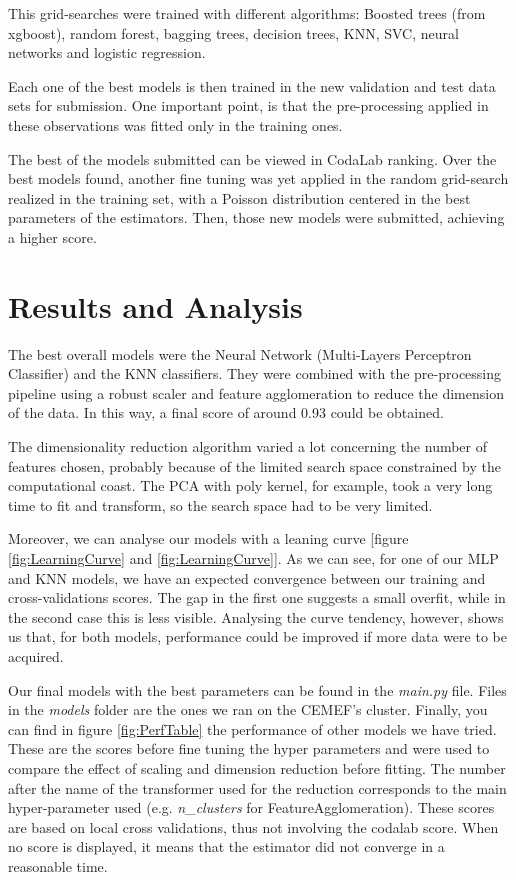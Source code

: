 \documentclass[letterpaper,11pt]{article}
\begin{document}
This grid-searches were trained with different algorithms: Boosted trees (from xgboost), random forest, bagging trees, decision trees, KNN, SVC, neural networks and logistic regression.

Each one of the best models is then trained in the new validation and test data sets for submission. One important point, is that the pre-processing applied in these observations was fitted only in the training ones.

The best of the models submitted can be viewed in CodaLab ranking. Over the best models found, another fine tuning was yet applied in the random grid-search realized in the training set, with a Poisson distribution centered in the best parameters of the estimators. Then, those new models were submitted, achieving a higher score.


\section{Results and Analysis}

The best overall models were the Neural Network (Multi-Layers Perceptron Classifier) and the KNN classifiers. They were combined with the pre-processing pipeline using a robust scaler and feature agglomeration to reduce the dimension of the data. In this way, a final score of around 0.93 could be obtained.

The dimensionality reduction algorithm varied a lot concerning the number of features chosen, probably because of the limited search space constrained by the computational coast. The PCA with poly kernel, for example, took a very long time to fit and transform, so the search space had to be very limited.

Moreover, we can analyse our models with a leaning curve [figure \ref{fig:LearningCurve} and \ref{fig:LearningCurve}]. As we can see, for one of our MLP and KNN models, we have an expected convergence between our training and cross-validations scores. The gap in the first one suggests a small overfit, while in the second case this is less visible. Analysing the curve tendency, however, shows us that, for both models, performance could be improved if more data were to be acquired.

Our final models with the best parameters can be found in the \textit{main.py}
file. Files in the \textit{models} folder are the ones we ran on the CEMEF's
cluster. Finally, you can find in figure \ref{fig:PerfTable} the performance of
other models we have tried. These are the scores before fine tuning the
hyper parameters and were used to compare the effect of scaling and dimension
reduction before fitting. The number after the name of the transformer used for
the reduction corresponds to the main hyper-parameter used
(e.g. \textit{n\_clusters} for FeatureAgglomeration). These scores are based on
local cross validations, thus not involving the codalab score. When no score is
displayed, it means that the estimator did not converge in a reasonable time.
\end{document}
